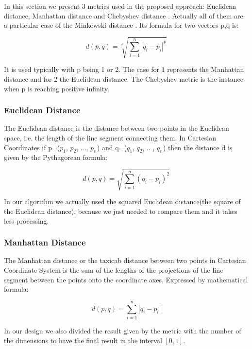 \documentclass[conference]{IEEEtran}
\begin{document}
In this section we present $3$ metrics used in the proposed approach: Euclidean distance, Manhattan distance and Chebyshev distance \cite{website:euclidean, website:manhattan, website:chebyshev}. Actually all of them are a particular case of the Minkowski distance \cite{website:minkowski}. Its formula for two vectors p,q is:

\begin{equation}
	d(p,q) = \sqrt[p]{\displaystyle\sum_{i=1}^{n} |q_i - p_i|^p}
\end{equation}

It is used typically with p being 1 or 2. The case for 1 represents the Manhattan distance and for 2 the Euclidean distance. The Chebyshev metric is the instance when p is reaching positive infinity.


\subsubsection{Euclidean Distance}

The Euclidean distance is the distance between two points in the Euclidean space, i.e. the length of the line segment connecting them. In Cartesian Coordinates \cite{website:cartesian} if p=($p_1$, $p_2$, ..., $p_n$) and q=($q_1$, $q_2$, .. , $q_n$) then the distance d is given by the Pythagorean formula:

\begin{equation}
	d(p,q) = \sqrt{\displaystyle\sum_{i=1}^{n} (q_i - p_i)^2}
\end{equation}

In our algorithm we actually used the squared Euclidean distance(the square of the Euclidean distance), because we just needed to compare them and it takes less processing.

\subsubsection{Manhattan Distance}

The Manhattan distance or the taxicab distance \cite{website:manhattan} between two points in Cartesian Coordinate System is the sum of the lengths of the projections of the line segment between the points onto the coordinate axes. Expressed by mathematical formula:

\begin{equation}
	d(p,q) = \displaystyle\sum_{i=1}^{n} |q_i - p_i|
\end{equation}

In our design we also divided the result given by the metric with the number of the dimensions to have the final result in the interval $[0,1]$.
\end{document}
